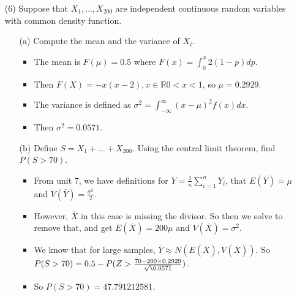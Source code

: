 \documentclass{article}
\begin{document}
\begin{enumerate}
\item [(6)] Suppose that $X_1,\ldots,X_{200}$ are independent continuous random variables with common density function.
    \begin{itemize}
    \item [(a)] Compute the mean and the variance of $X_i$.
        \begin{itemize}
        \item The mean is $F(\mu) = 0.5$ where $F(x) = \int_0^x 2(1 - p)dp$.
        \item Then $F(X) = -x(x - 2), x \in \mathbb{R} 0 < x < 1$, so $\mu = 0.2929$.
        \item The variance is defined as $\sigma^2 = \int_{-\infty}^{\infty} (x - \mu)^2 f(x) dx$.
        \item Then $\sigma^2 = 0.0571$.
        \end{itemize}
    \item [(b)] Define $S=X_1+\ldots+X_{200}$. Using the central limit theorem, find $P(S>70)$.
        \begin{itemize}
        \item From unit 7, we have definitions for $\overbar{Y} = \frac{1}{n} \sum_{i = 1}^n Y_i$, that $E(\overbar{Y}) = \mu$ and $V(\overbar{Y}) = \frac{\sigma^2}{2}$.
        \item However, $\overbar{X}$ in this case is missing the divisor. So then we solve to remove that, and get $E(\overbar{X}) = 200 \mu$ and $V(\overbar{X}) = \sigma^2$.
        \item We know that for large samples, $\overbar{Y} \approx N(E(\overbar{X}), V(\overbar{X}))$. So $P(S > 70) = 0.5 - P(Z > \frac{70 - 200 \times 0.2929}{\sqrt{\0.0571}})$.
        \item So $P(S > 70) = 47.791212581$.
        \end{itemize}
    \end{itemize}
\end{enumerate}
\end{document}
